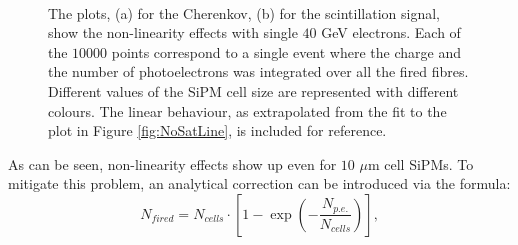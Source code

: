 \begin{figure}
	\centering
	\\
	\caption{The plots, (a) for the Cherenkov, (b) for the scintillation signal, show the non-linearity effects with single $40$ GeV electrons. Each of the $10000$ points correspond to a single event where the charge and the number of photoelectrons was integrated over all the fired fibres. Different values of the SiPM cell size are represented with different colours. The linear behaviour, as extrapolated from the fit to the plot in Figure \ref{fig:NoSatLine}, is included for reference.}
	\label{fig:sat_events}
\end{figure}

As can be seen, non-linearity effects show up even for $10$ $\mu$m cell SiPMs. To mitigate this problem, an analytical correction can be introduced via the formula:
\begin{equation}
	N_{fired}=N_{cells} \cdot \left[ 1 - \exp\left(-\frac{N_{p.e.}}{N_{cells}}\right)\right],
\end{equation}

